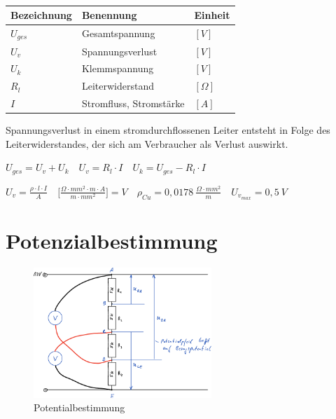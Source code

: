 \begin{table}[!ht]%
\centering 
	\caption{}%
\begin{tabular}{@{}lll@{}}
\hline
\textbf{Bezeichnung} & \textbf{Benennung} & \textbf{Einheit} \\
\hline
$U_{ges}$ & Gesamtspannung & $[V]$ \\
$U_v$ & Spannungsverlust & $[V]$ \\
$U_k$ & Klemmspannung & $[V]$ \\
$R_l$ & Leiterwiderstand & $[\Omega]$ \\
$I$ & Stromfluss, Stromstärke & $[A]$ \\
\hline
\end{tabular} 
\end{table}

Spannungsverlust in einem stromdurchflossenen Leiter entsteht in Folge
des Leiterwiderstandes, der sich am Verbraucher als Verlust auswirkt.

$U_{ges} = U_v + U_k \quad U_v = R_l \cdot I \quad U_k = U_{ges} - R_l \cdot I$

$\boxed{U_v = \frac{\rho \cdot l \cdot I}{A}} \quad \bigl[\frac{\Omega \cdot mm^2 \cdot m \cdot A}{m \cdot mm^2}\bigl] = V \quad \rho_{Cu} = 0,0178~\frac{\Omega \cdot mm^2}{m} \quad \boxed{U_{v_{max}} = 0,5~V}$

\newpage

\section{Potenzialbestimmung}\label{potenzialbestimmung}

\begin{figure}[!ht]%
\centering
\includegraphics[width=0.6\textwidth]{images/Skizze/28_FT_Potentialbestimmung.pdf}
\caption{Potentialbestimmung}
\end{figure}

